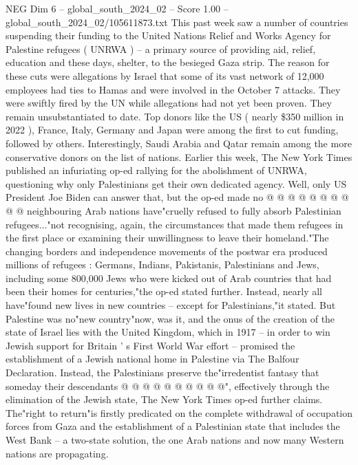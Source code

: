 \begin{textsample}{NEG Dim 6 – global\_south\_2024\_02 – Score 1.00 – global\_south\_2024\_02/105611873.txt}  \label{ex:f6_neg_282}
This past week saw a number of countries suspending their funding to the United Nations Relief and Works Agency for Palestine refugees ( UNRWA ) -- a primary source of providing aid, relief, education and these days, shelter, to the besieged Gaza strip.
The reason for these cuts were allegations by Israel that some of its vast network of 12,000 employees had ties to Hamas and were involved in the October 7 attacks.
They were swiftly fired by the UN while allegations had not yet been proven.
They remain unsubstantiated to date.
Top donors like the US ( nearly \$350 million in 2022 ), France, Italy, Germany and Japan were among the first to cut funding, followed by others.
Interestingly, Saudi Arabia and Qatar remain among the more conservative donors on the list of nations.
Earlier this week, The New York Times published an infuriating op-ed rallying for the abolishment of UNRWA, questioning why only Palestinians get their own dedicated agency.
Well, only US President Joe Biden can answer that, but the op-ed made no @ @ @ @ @ @ @ @ @ @ neighbouring Arab nations have"cruelly refused to fully absorb Palestinian refugees..."not recognising, again, the circumstances that made them refugees in the first place or examining their unwillingness to leave their homeland."The changing borders and independence movements of the postwar era produced millions of refugees : Germans, Indians, Pakistanis, Palestinians and Jews, including some 800,000 Jews who were kicked out of Arab countries that had been their homes for centuries,"the op-ed stated further.
Instead, nearly all have"found new lives in new countries -- except for Palestinians,"it stated.
But Palestine was no"new country"now, was it, and the onus of the creation of the state of Israel lies with the United Kingdom, which in 1917 -- in order to win Jewish support for Britain ' s First World War effort -- promised the establishment of a Jewish national home in Palestine via The Balfour Declaration.
Instead, the Palestinians preserve the"irredentist fantasy that someday their descendants @ @ @ @ @ @ @ @ @ @", effectively through the elimination of the Jewish state, The New York Times op-ed further claims.
The"right to return"is firstly predicated on the complete withdrawal of occupation forces from Gaza and the establishment of a Palestinian state that includes the West Bank -- a two-state solution, the one Arab nations and now many Western nations are propagating.

\end{textsample}
